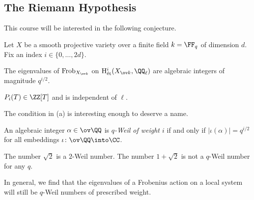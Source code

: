 \documentclass[../notes.tex]{subfiles}
\begin{document}
\subsection{The Riemann Hypothesis}
This course will be interested in the following conjecture.
\begin{conj}
	Let $X$ be a smooth projective variety over a finite field $k=\FF_q$ of dimension $d$. Fix an index $i\in\{0,\ldots,2d\}$.
	\begin{listalph}
		\item The eigenvalues of $\mathrm{Frob}_{X_{\ov k}}$ on $\mathrm H^i_{\mathrm{\acute et}}(X_{\ov k},\QQ_\ell)$ are algebraic integers of magnitude $q^{i/2}$.
		\item $P_i(T)\in\ZZ[T]$ and is independent of $\ell$.
	\end{listalph}
\end{conj}
The condition in (a) is interesting enough to deserve a name.
\begin{defihelper}[$q$-Weil] 
	An algebraic integer $\alpha\in\ov\QQ$ is \textit{$q$-Weil of weight $i$} if and only if $\left|\iota(\alpha)\right|=q^{i/2}$ for all embeddings $\iota\colon\ov\QQ\into\CC$.
\end{defihelper}
\begin{example}
	The number $\sqrt2$ is a $2$-Weil number. The number $1+\sqrt2$ is not a $q$-Weil number for any $q$.
\end{example}
In general, we find that the eigenvalues of a Frobenius action on a local system will still be $q$-Weil numbers of prescribed weight.
\end{document}
